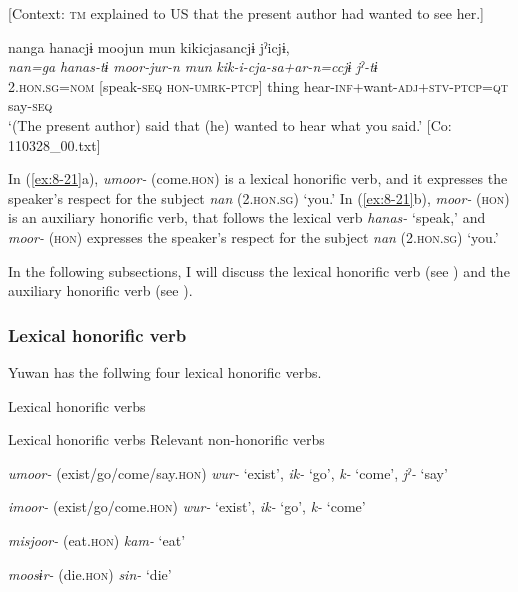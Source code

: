     [Context: \textsc{tm} explained to US that the present author had wanted to see her.]

{\TM}
\gllll  nanga  hanacjɨ  moojun  mun    kikicjasancjɨ  jˀicjɨ,\\
\textit{nan=ga}  \textit{hanas-tɨ}  \textit{moor-jur-n  mun} \textit{kik-i-cja-sa+ar-n=ccjɨ}  \textit{jˀ-tɨ}\\
2.\textsc{hon}.\textsc{sg}=\textsc{nom}  [speak-\textsc{seq}  \textsc{hon}-\textsc{umrk}-\textsc{ptcp}]  thing   hear-\textsc{inf}+want-\textsc{adj}+\textsc{stv}-\textsc{ptcp}=\textsc{qt}  say-\textsc{seq}\\
\glt ‘(The present author) said that (he) wanted to hear what you said.’ [Co: 110328\_00.txt]
\z

In (\ref{ex:8-21}a), \textit{umoor-} (come.\textsc{hon}) is a lexical honorific verb, and it expresses the speaker’s respect for the subject \textit{nan} (2.\textsc{hon}.\textsc{sg}) ‘you.’ In (\ref{ex:8-21}b), \textit{moor-} (\textsc{hon}) is an auxiliary honorific verb, that follows the lexical verb \textit{hanas-} ‘speak,’ and \textit{moor-} (\textsc{hon}) expresses the speaker’s respect for the subject \textit{nan} (2.\textsc{hon}.\textsc{sg}) ‘you.’

  In the following subsections, I will discuss the lexical honorific verb (see ) and the auxiliary honorific verb (see ).

\subsubsection{Lexical honorific verb}

Yuwan has the follwing four lexical honorific verbs.

\begin{table}
\caption{\label{tab:key:72}Lexical honorific verbs}

Lexical honorific verbs  Relevant non-honorific verbs

\textit{umoor-} (exist/go/come/say.\textsc{hon})  \textit{wur-} ‘exist’, \textit{ik-} ‘go’, \textit{k-} ‘come’, \textit{jˀ-} ‘say’

\textit{imoor-} (exist/go/come.\textsc{hon})  \textit{wur-} ‘exist’, \textit{ik-} ‘go’, \textit{k-} ‘come’

\textit{misjoor-} (eat.\textsc{hon})  \textit{kam-} ‘eat’

\textit{moosɨr-} (die.\textsc{hon})  \textit{sin-} ‘die’
\end{table}

